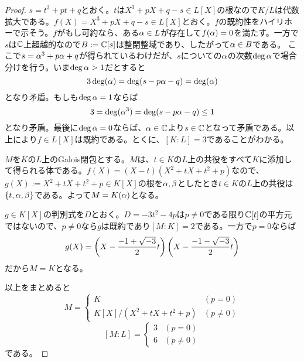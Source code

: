 \newpage

\subsubsection{}%
\begin{proof}
  $s = t^3 + pt + q$とおく。$t$は$X^3 + pX + q -s \in L[X]$の根なので$K/L$は代数拡大である。$f(X) = X^3 + pX + q - s \in L[X]$とおく。$f$の既約性をハイリホーで示そう。$f$がもし可約なら、ある${\alpha} \in L$が存在して$f({\alpha})=0$を満たす。一方で$s $は${\mathbb C}$上超越的なので$B := {\mathbb C}[s]$は整閉整域であり、したがって${\alpha} \in B$である。
  ここで$s = {\alpha}^3 + p {\alpha} + q$が得られているわけだが、$s$についての${\alpha}$の次数$\deg {\alpha}$で場合分けを行う。いま$\deg {\alpha} >1$だとすると
  \[
  3 \deg({\alpha}) = \deg( s - p {\alpha} - q ) = \deg({\alpha})
  \]
  となり矛盾。もしも$\deg {\alpha} = 1$ならば
  \[
  3 = \deg({\alpha}^3) = \deg(s - p {\alpha} - q) \leq 1
  \]
  となり矛盾。最後に$\deg {\alpha} = 0$ならば、${\alpha} \in {\mathbb C}$より$s \in {\mathbb C}$となって矛盾である。以上により$f \in L[X]$は既約である。とくに、$[K:L]=3$であることがわかる。

  $M$を$K$の$L$上のGalois閉包とする。$M$は、$t \in K$の$L$上の共役をすべて$K$に添加して得られる体である。$f(X) = (X - t)(X^2 + t X + t^2 + p)$なので、$g(X):= X^2 +tX + t^2 + p \in K[X]$の根を${\alpha}, \beta$としたとき$t \in K$の$L$上の共役は$\{t, {\alpha} ,\beta \}$である。よって$M = K({\alpha})$となる。

  $g \in K[X]$の判別式を$D$とおく。$D = - 3t^2 - 4p$は$p \neq 0$である限り${\mathbb C}[t]$の平方元ではないので、$p \neq 0$なら$g$は既約であり$[M: K]=2$である。一方で$p=0$ならば
  \[
  g(X) = \left( X - \frac{-1 + \sqrt{-3}}{2} t \right) \left( X - \frac{-1 - \sqrt{-3}}{2} t \right)
  \]
  だから$M = K$となる。

  以上をまとめると
  \[
  M = \begin{cases}
  K &(p=0) \\
  K[X]/(X^2 + tX + t^2 + p) &(p \neq 0)
\end{cases}
  \]
  \[
  [M:L] = \begin{cases}
  3 &(p=0) \\
  6 &(p \neq 0)
\end{cases}
  \]
  である。
\end{proof}
